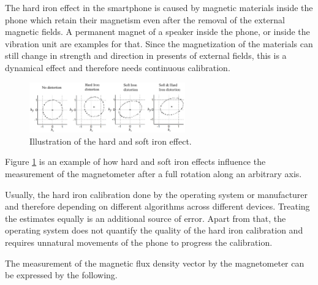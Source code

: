 



The hard iron effect in the smartphone is caused by magnetic materials inside the phone which retain their magnetism even after the removal of the external magnetic fields. A permanent magnet of a speaker inside the phone, or inside the vibration unit are examples for that. Since the magnetization of the materials can still change in strength and direction in presents of external fields, this is a dynamical effect and therefore needs continuous calibration.

\begin{figure}[hbt!]
    \centering
    \includegraphics[width=0.6\textwidth]{figures/hard_soft_iron.jpg}
    \caption{Illustration of the hard and soft iron effect.\cite{hard_soft_iron}}
    \label{fig:hard_soft_iron}
\end{figure}

Figure \ref{fig:hard_soft_iron} is an example of how hard and soft iron effects influence the measurement of the magnetometer after a full rotation along an arbitrary axis.

Usually, the hard iron calibration done by the operating system or manufacturer and therefore depending on different algorithms across different devices. Treating the estimates equally is an additional source of error. Apart from that, the operating system does not quantify the quality of the hard iron calibration and requires unnatural movements of the phone to progress the calibration.

The measurement of the magnetic flux density vector by the magnetometer can be expressed by the following.

